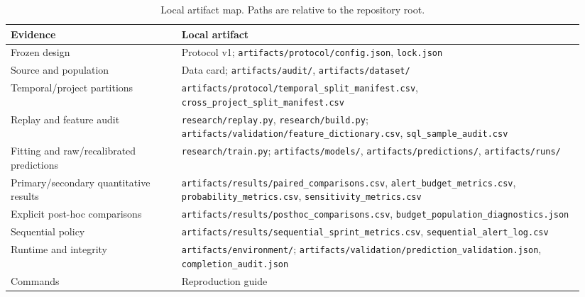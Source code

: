 \begin{longtable}{@{}>{\raggedright\arraybackslash}p{0.28\linewidth}>{\raggedright\arraybackslash}p{0.66\linewidth}@{}}
\caption{Local artifact map. Paths are relative to the repository root.}\label{tab:artifact_map}\\
\toprule
Evidence & Local artifact \\
\midrule
Frozen design & Protocol v1; \texttt{artifacts/\allowbreak{}protocol/\allowbreak{}config.json}, \texttt{lock.json} \\
Source and population & Data card; \texttt{artifacts/\allowbreak{}audit/\allowbreak{}}, \texttt{artifacts/\allowbreak{}dataset/\allowbreak{}} \\
Temporal/project partitions & \texttt{artifacts/\allowbreak{}protocol/\allowbreak{}temporal\_\allowbreak{}split\_\allowbreak{}manifest.csv}, \texttt{cross\_\allowbreak{}project\_\allowbreak{}split\_\allowbreak{}manifest.csv} \\
Replay and feature audit & \texttt{research/\allowbreak{}replay.py}, \texttt{research/\allowbreak{}build.py}; \texttt{artifacts/\allowbreak{}validation/\allowbreak{}feature\_\allowbreak{}dictionary.csv}, \texttt{sql\_\allowbreak{}sample\_\allowbreak{}audit.csv} \\
Fitting and raw/recalibrated predictions & \texttt{research/\allowbreak{}train.py}; \texttt{artifacts/\allowbreak{}models/\allowbreak{}}, \texttt{artifacts/\allowbreak{}predictions/\allowbreak{}}, \texttt{artifacts/\allowbreak{}runs/\allowbreak{}} \\
Primary/secondary quantitative results & \texttt{artifacts/\allowbreak{}results/\allowbreak{}paired\_\allowbreak{}comparisons.csv}, \texttt{alert\_\allowbreak{}budget\_\allowbreak{}metrics.csv}, \texttt{probability\_\allowbreak{}metrics.csv}, \texttt{sensitivity\_\allowbreak{}metrics.csv} \\
Explicit post-hoc comparisons & \texttt{artifacts/\allowbreak{}results/\allowbreak{}posthoc\_\allowbreak{}comparisons.csv}, \texttt{budget\_\allowbreak{}population\_\allowbreak{}diagnostics.json} \\
Sequential policy & \texttt{artifacts/\allowbreak{}results/\allowbreak{}sequential\_\allowbreak{}sprint\_\allowbreak{}metrics.csv}, \texttt{sequential\_\allowbreak{}alert\_\allowbreak{}log.csv} \\
Runtime and integrity & \texttt{artifacts/\allowbreak{}environment/\allowbreak{}}; \texttt{artifacts/\allowbreak{}validation/\allowbreak{}prediction\_\allowbreak{}validation.json}, \texttt{completion\_\allowbreak{}audit.json} \\
Commands & Reproduction guide \\
\bottomrule
\end{longtable}

